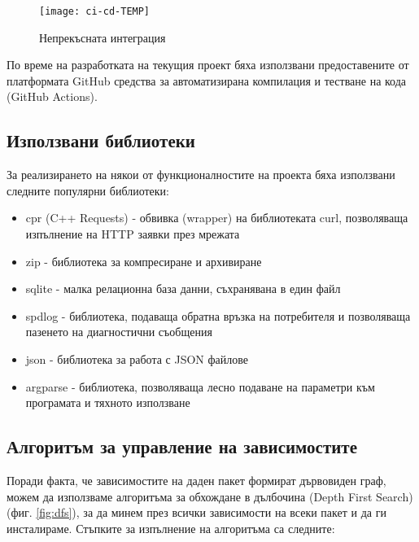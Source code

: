 \begin{figure}[h]
    \centering
    \texttt{[image: ci-cd-TEMP]}
    \caption{Непрекъсната интеграция}
    \label{fig:ci-cd}
\end{figure}

По време на разработката на текущия проект бяха използвани предоставените от
платформата GitHub средства за автоматизирана компилация и тестване на кода
(GitHub Actions).


\subsection{Използвани библиотеки}

За реализирането на някои от функционалностите на проекта бяха използвани
следните популярни библиотеки:

\begin{itemize}
    \item cpr (C++ Requests) - обвивка (wrapper) на библиотеката curl,
          позволяваща изпълнение на HTTP заявки през мрежата
    \item zip - библиотека за компресиране и архивиране
    \item sqlite - малка релационна база данни, съхранявана в един файл
    \item spdlog - библиотека, подаваща обратна връзка на потребителя и
          позволяваща пазенето на диагностични съобщения
    \item json - библиотека за работа с JSON файлове
    \item argparse - библиотека, позволяваща лесно подаване на параметри към
          програмата и тяхното използване
\end{itemize}


\subsection{Алгоритъм за управление на зависимостите}

Поради факта, че зависимостите на даден пакет формират дървовиден граф, можем да
използваме алгоритъма за обхождане в дълбочина (Depth First Search)
(фиг. \ref{fig:dfs}), за да минем през всички зависимости на всеки пакет и да ги
инсталираме. Стъпките за изпълнение на алгоритъма са следните:

